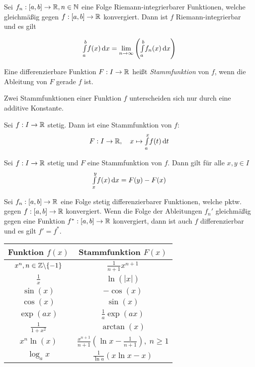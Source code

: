 \documentclass{cheat-sheet}
\begin{document}
\begin{satz}
  Sei $f_n : [a, b] \to \mathbb{R}, n \in \mathbb{N}$ eine Folge Riemann-integrierbarer Funktionen, welche gleichmäßig gegen $f : [a, b] \to \mathbb{R}$ konvergiert. Dann ist $f$ Riemann-integrierbar und es gilt

  \[ {\textstyle \int\limits_{a}^{b}} f(x) \,\mathrm{d} x = \lim_{n \to \infty} \left({\textstyle \int\limits_{a}^{b}} f_n(x) \,\mathrm{d} x \right) \]
\end{satz}

\begin{defn}
Eine differenzierbare Funktion $F: I \to \mathbb{R}$ heißt \emph{Stammfunktion} von $f$, wenn die Ableitung von $F$ gerade $f$ ist.
\end{defn}

\begin{bem}
Zwei Stammfunktionen einer Funktion $f$ unterscheiden sich nur durch eine additive Konstante.
\end{bem}

\begin{satz}
Sei $f : I \to \mathbb{R}$ stetig. Dann ist eine Stammfunktion von $f$:
\[ F : I \to \mathbb{R}, \quad x \mapsto {\textstyle \int\limits_{a}^{x}} f(t) \,\mathrm{d} t \]
\end{satz}

\begin{satz}
  Sei $f : I \to \mathbb{R}$ stetig und $F$ eine Stammfunktion von $f$. Dann gilt für alle $x, y \in I$
  \[ {\textstyle \int\limits_{x}^{y}} f(x) \,\mathrm{d} x = F(y) - F(x) \]
\end{satz}

\begin{satz}
Sei $f_n : [a, b] \to \mathbb{R}$ eine Folge stetig differenzierbarer Funktionen, welche pktw. gegen $f : [a, b] \to \mathbb{R}$ konvergiert. Wenn die Folge der Ableitungen $f_n'$ gleichmäßig gegen eine Funktion $f^{*} : [a, b] \to \mathbb{R}$ konvergiert, dann ist auch $f$ differenzierbar und es gilt $f' = f^{*}$.
\end{satz}

\center
\begin{tabular}{ | c | c | }
  \hline
  Funktion $f(x)$ & Stammfunktion $F(x)$ \\ \hline \hline
  $x^n, n \in \mathbb{Z}\backslash\{-1\}$ & $\tfrac{1}{n+1}x^{n+1}$ \\ \hline
  $\tfrac{1}{x}$ & $\ln(|x|)$ \\ \hline
  $\sin(x)$ & $-\cos(x)$ \\ \hline
  $\cos(x)$ & $\sin(x)$ \\ \hline
  $\exp(ax)$ & $\tfrac{1}{a}\exp(ax)$ \\ \hline
  $\tfrac{1}{1 + x^2}$ & $\arctan(x)$ \\ \hline
  $x^n \ln(x)$ & $\tfrac{x^{n+1}}{n+1}(\ln x - \tfrac{1}{n+1}),\ n \ge 1$ \\ \hline
  $\log_a x$ & $\tfrac{1}{\ln a}(x \ln x - x)$ \\ \hline
\end{tabular}
\end{document}
